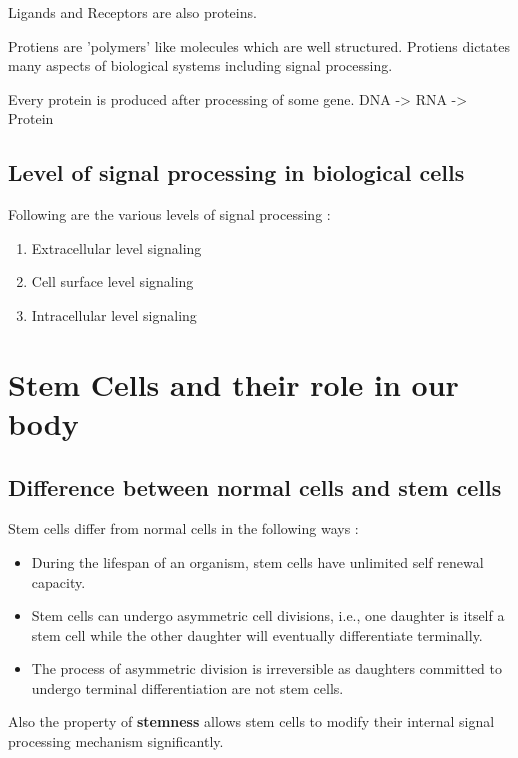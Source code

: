 \documentclass[11pt]{report}
\begin{document}
Ligands and Receptors are also proteins.

Protiens are 'polymers' like molecules which are well structured.
Protiens dictates many aspects of biological systems including signal processing.

Every protein is produced after processing of some gene.
DNA -> RNA -> Protein

\section{\color{red}Level of signal processing in biological cells}
Following are the various levels of signal processing :
\begin{enumerate}
 \item Extracellular level signaling
 \item Cell surface level signaling
 \item Intracellular level signaling
\end{enumerate}

 \chapter{Stem Cells and their role in our body}
 \section{\color{red}Difference between normal cells and stem cells}
 Stem cells differ from normal cells in the following ways \cite{hall1989stem}:
 \begin{itemize}
  \item During the lifespan of an organism, stem cells have unlimited self renewal capacity.
  \item Stem cells can undergo asymmetric cell divisions, i.e., one daughter is itself a stem cell while the other daughter will
  eventually differentiate terminally.
  \item The process of asymmetric division is irreversible as daughters committed to undergo terminal differentiation are not stem
  cells.
 \end{itemize}
 Also the property of \textbf{stemness} allows stem cells to modify their internal signal processing mechanism significantly.
 
\end{document}

